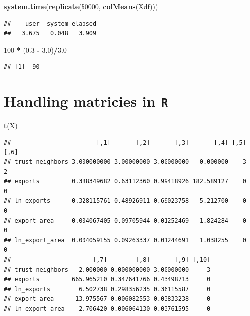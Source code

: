 \documentclass[]{book}
\newenvironment{Shaded}{\begin{snugshade}}{\end{snugshade}}
\newcommand{\KeywordTok}[1]{\textcolor[rgb]{0.13,0.29,0.53}{\textbf{#1}}}
\newcommand{\DecValTok}[1]{\textcolor[rgb]{0.00,0.00,0.81}{#1}}
\newcommand{\FloatTok}[1]{\textcolor[rgb]{0.00,0.00,0.81}{#1}}
\newcommand{\StringTok}[1]{\textcolor[rgb]{0.31,0.60,0.02}{#1}}
\newcommand{\OperatorTok}[1]{\textcolor[rgb]{0.81,0.36,0.00}{\textbf{#1}}}
\newcommand{\NormalTok}[1]{#1}
\theoremstyle{definition}
\theoremstyle{definition}
\theoremstyle{definition}
\theoremstyle{remark}
\begin{document}
\begin{Shaded}
\begin{Highlighting}[]
\KeywordTok{system.time}\NormalTok{(}\KeywordTok{replicate}\NormalTok{(}\DecValTok{50000}\NormalTok{, }\KeywordTok{colMeans}\NormalTok{(Xdf)))}
\end{Highlighting}
\end{Shaded}

\begin{verbatim}
##    user  system elapsed 
##   3.675   0.048   3.909
\end{verbatim}

\begin{Shaded}
\begin{Highlighting}[]
\DecValTok{100} \OperatorTok{*}\StringTok{ }\NormalTok{(}\FloatTok{0.3} \OperatorTok{-}\StringTok{ }\FloatTok{3.0}\NormalTok{)}\OperatorTok{/}\FloatTok{3.0}
\end{Highlighting}
\end{Shaded}

\begin{verbatim}
## [1] -90
\end{verbatim}

\section{\texorpdfstring{Handling matricies in
\texttt{R}}{Handling matricies in R}}\label{handling-matricies-in-r}

\begin{Shaded}
\begin{Highlighting}[]
\KeywordTok{t}\NormalTok{(X)}
\end{Highlighting}
\end{Shaded}

\begin{verbatim}
##                        [,1]       [,2]       [,3]       [,4] [,5] [,6]
## trust_neighbors 3.000000000 3.00000000 3.00000000   0.000000    3    2
## exports         0.388349682 0.63112360 0.99418926 182.589127    0    0
## ln_exports      0.328115761 0.48926911 0.69023758   5.212700    0    0
## export_area     0.004067405 0.09705944 0.01252469   1.824284    0    0
## ln_export_area  0.004059155 0.09263337 0.01244691   1.038255    0    0
##                       [,7]        [,8]       [,9] [,10]
## trust_neighbors   2.000000 0.000000000 3.00000000     3
## exports         665.965210 0.347641766 0.43498713     0
## ln_exports        6.502738 0.298356235 0.36115587     0
## export_area      13.975567 0.006082553 0.03833238     0
## ln_export_area    2.706420 0.006064130 0.03761595     0
\end{verbatim}
\end{document}
